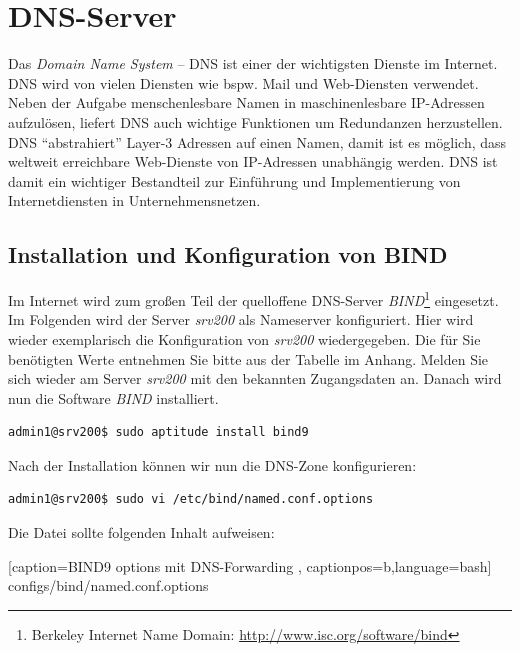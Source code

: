 \section{DNS-Server}
Das \textit{Domain Name System} – DNS ist einer der wichtigsten Dienste im
Internet. DNS wird von vielen Diensten wie bspw. Mail und Web-Diensten
verwendet. Neben der Aufgabe menschenlesbare Namen in maschinenlesbare
IP-Adressen aufzulösen, liefert DNS auch wichtige Funktionen um Redundanzen
herzustellen. DNS "`abstrahiert"' Layer-3 Adressen auf einen Namen, damit ist es
möglich, dass weltweit erreichbare Web-Dienste von IP-Adressen unabhängig
werden. DNS ist damit ein wichtiger Bestandteil zur Einführung und
Implementierung von Internetdiensten in Unternehmensnetzen.

\subsection{Installation und Konfiguration von BIND}
Im Internet wird zum großen Teil der quelloffene DNS-Server
\textit{BIND}\footnote{Berkeley Internet Name
Domain: \url{http://www.isc.org/software/bind}} eingesetzt. Im Folgenden wird
der Server \textit{srv200} als Nameserver konfiguriert. Hier wird wieder
exemplarisch die Konfiguration von \textit{srv200} wiedergegeben. Die für Sie
benötigten Werte entnehmen Sie bitte aus der Tabelle im Anhang. Melden Sie sich
wieder am Server \textit{srv200} mit den bekannten Zugangsdaten an. Danach wird
nun die Software \textit{BIND} installiert.

\begin{lstlisting}
admin1@srv200$ sudo aptitude install bind9
\end{lstlisting}

Nach der Installation können wir nun die DNS-Zone konfigurieren:
\begin{lstlisting}
admin1@srv200$ sudo vi /etc/bind/named.conf.options
\end{lstlisting}
Die Datei sollte folgenden Inhalt aufweisen:


    [caption={BIND9 options mit DNS-Forwarding}
       \label{lst:named.conf.options},
       captionpos=b,language=bash]
{configs/bind/named.conf.options}

